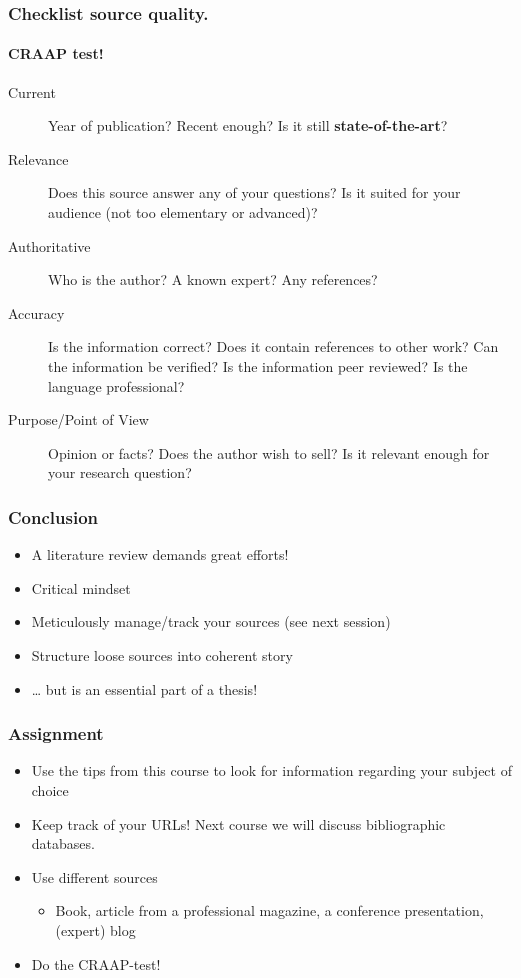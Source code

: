 \documentclass[aspectratio=169]{beamer}
\begin{document}
\begin{frame}
    \frametitle{Checklist source quality.}
    \framesubtitle{CRAAP test!}

    \begin{description}
        \item[Current] Year of publication? Recent enough? Is it still \textbf{state-of-the-art}?
        \item[Relevance] Does this source answer any of your questions? Is it suited for your audience (not too elementary or advanced)?
        \item[Authoritative] Who is the author? A known expert? Any references?
        \item[Accuracy] Is the information correct? Does it contain references to other work? Can the information be verified? Is the information peer reviewed? Is the language professional?
        \item[Purpose/Point of View] Opinion or facts? Does the author wish to sell? Is it relevant enough for your research question?
    \end{description}

\end{frame}

\begin{frame}
    \frametitle{Conclusion}

    \begin{itemize}
        \item A literature review demands great efforts!
        \item Critical mindset
        \item Meticulously manage/track your sources (see next session)
        \item Structure loose sources into coherent story
        \item \ldots{} but is an essential part of a thesis!
    \end{itemize}

\end{frame}

\begin{frame}
    \frametitle{Assignment}
  
    \begin{itemize}
      \item Use the tips from this course to look for information regarding your subject of choice
      \item Keep track of your URLs! Next course we will discuss bibliographic databases.
      \item Use different sources
            \begin{itemize}
              \item Book, article from a professional magazine, a conference presentation, (expert) blog 
            \end{itemize}
      \item Do the CRAAP-test!
    \end{itemize}
  
  \end{frame}
\end{document}
